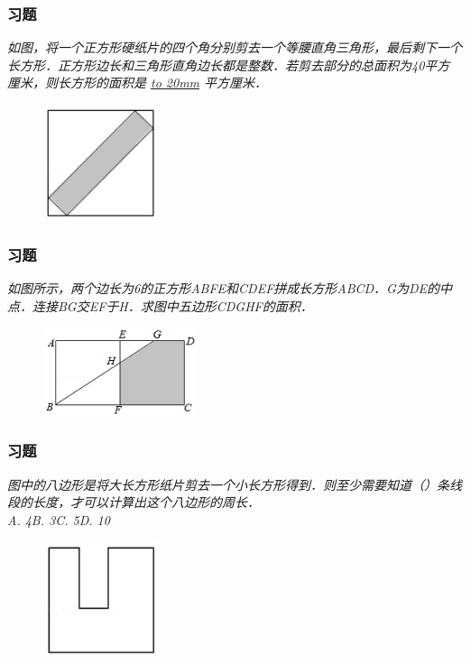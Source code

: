 \begin{frame}
    \frametitle{习题\theframecounter}
    \textit{如图，将一个正方形硬纸片的四个角分别剪去一个等腰直角三角形，最后剩下一个长方形．正方形边长和三角形直角边长都是整数．若剪去部分的总面积为40平方厘米，则长方形的面积是 \underline{\hbox to 20mm{}} 平方厘米．} 
    \begin{figure}[H] 
        \centering
        \includegraphics[width=0.3\textwidth]{./pics/Chapter_3/12.png}
    \end{figure}
\end{frame}

\begin{frame}
    \frametitle{习题\theframecounter}
    \vspace*{-1cm}
    \textit{如图所示，两个边长为6的正方形ABFE和CDEF拼成长方形ABCD．G为DE的中点．连接BG交EF于H．求图中五边形CDGHF的面积．} 
    \begin{figure}[H] 
        \centering
        \includegraphics[width=0.4\textwidth]{./pics/Chapter_3/13.png}
    \end{figure}
\end{frame}

\begin{frame}
    \frametitle{习题\theframecounter}
    \textit{图中的八边形是将大长方形纸片剪去一个小长方形得到．则至少需要知道（\quad）条线段的长度，才可以计算出这个八边形的周长．} \\
    \textit{A. 4\quad B. 3\quad C. 5\quad D. 10}
    \begin{figure}[H] 
        \centering
        \includegraphics[width=0.3\textwidth]{./pics/Chapter_3/14.png}
    \end{figure}
\end{frame}

